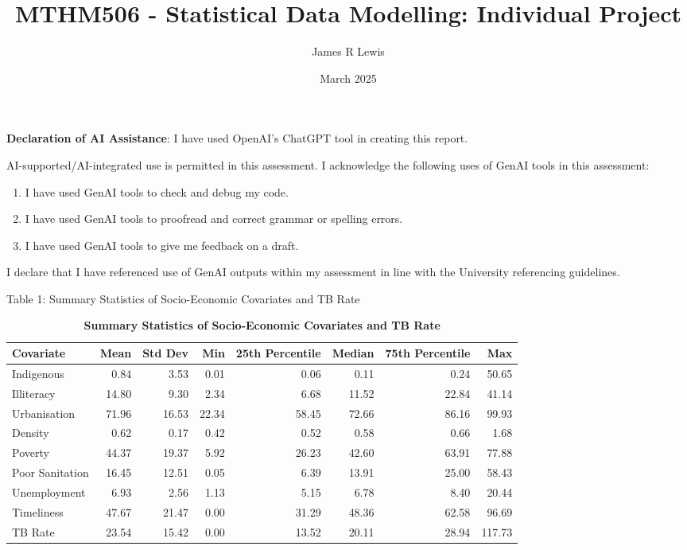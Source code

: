 \documentclass[
  11pt,
  a4paper,11pt]{article}
\title{MTHM506 - Statistical Data Modelling: Individual Project}
\author{James R Lewis}
\date{March 2025}
\providecommand{\tightlist}{%
  \setlength{\itemsep}{0pt}\setlength{\parskip}{0pt}}
\begin{document}
\maketitle

{
\setcounter{tocdepth}{2}
\tableofcontents
}
\textbf{Declaration of AI Assistance}: I have used OpenAI's ChatGPT tool
in creating this report.

AI-supported/AI-integrated use is permitted in this assessment. I
acknowledge the following uses of GenAI tools in this assessment:

\begin{enumerate}
\def\labelenumi{\arabic{enumi}.}
\tightlist
\item
  I have used GenAI tools to check and debug my code.
\item
  I have used GenAI tools to proofread and correct grammar or spelling
  errors.
\item
  I have used GenAI tools to give me feedback on a draft.
\end{enumerate}

I declare that I have referenced use of GenAI outputs within my
assessment in line with the University referencing guidelines.

\newpage

\begin{table}[!t]
\caption{\label{tab:table-1}Table 1: Summary Statistics of Socio-Economic Covariates and TB Rate} 
\caption*{
{\large \textbf{Summary Statistics of Socio-Economic Covariates and TB Rate}}
} 
\fontsize{9.8pt}{11.7pt}\selectfont
\begin{tabular*}{1\linewidth}{@{\extracolsep{\fill}}lrrrrrrr}
\toprule
Covariate & {\bfseries Mean} & Std Dev & {\bfseries Min} & 25th Percentile & {\bfseries Median} & 75th Percentile & {\bfseries Max} \\ 
\midrule\addlinespace[2.5pt]
Indigenous & 0.84 & 3.53 & 0.01 & 0.06 & 0.11 & 0.24 & 50.65 \\ 
Illiteracy & 14.80 & 9.30 & 2.34 & 6.68 & 11.52 & 22.84 & 41.14 \\ 
Urbanisation & 71.96 & 16.53 & 22.34 & 58.45 & 72.66 & 86.16 & 99.93 \\ 
Density & 0.62 & 0.17 & 0.42 & 0.52 & 0.58 & 0.66 & 1.68 \\ 
Poverty & 44.37 & 19.37 & 5.92 & 26.23 & 42.60 & 63.91 & 77.88 \\ 
Poor Sanitation & 16.45 & 12.51 & 0.05 & 6.39 & 13.91 & 25.00 & 58.43 \\ 
Unemployment & 6.93 & 2.56 & 1.13 & 5.15 & 6.78 & 8.40 & 20.44 \\ 
Timeliness & 47.67 & 21.47 & 0.00 & 31.29 & 48.36 & 62.58 & 96.69 \\ 
TB Rate & 23.54 & 15.42 & 0.00 & 13.52 & 20.11 & 28.94 & 117.73 \\ 
\bottomrule
\end{tabular*}
\end{table}
\end{document}
